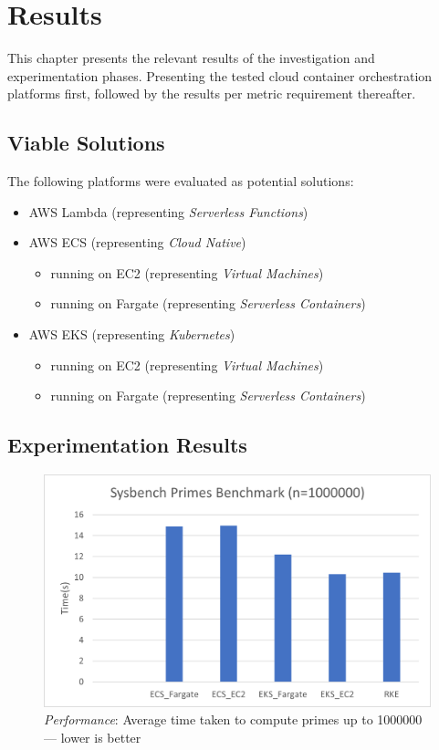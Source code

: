 \chapter{Results}
\label{sec:results}

This chapter presents the relevant results of the investigation and experimentation phases.
Presenting the tested cloud container orchestration platforms first,
followed by the results per metric requirement thereafter.

\section{Viable Solutions}
The following platforms were evaluated as potential solutions:
\begin{itemize}
  \item AWS Lambda (representing \textit{Serverless Functions})
  \item AWS ECS (representing \textit{Cloud Native})
        \begin{itemize}
          \item running on EC2 (representing \textit{Virtual Machines})
          \item running on Fargate (representing \textit{Serverless Containers})
        \end{itemize}
  \item AWS EKS (representing \textit{Kubernetes})
        \begin{itemize}
          \item running on EC2 (representing \textit{Virtual Machines})
          \item running on Fargate (representing \textit{Serverless Containers})
        \end{itemize}
\end{itemize}

\section{Experimentation Results}

\begin{figure}[hp]
  \includegraphics{images/perf-sysbench.png}
  \caption{\emph{Performance}: Average time taken to compute primes up to 1000000 --- lower is better }
  \label{fig:perf_sysbench}
\end{figure}

